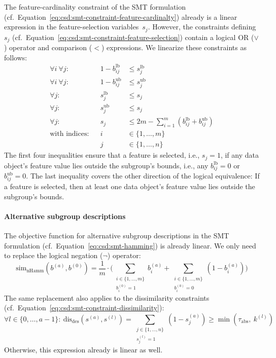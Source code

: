 The feature-cardinality constraint of the SMT formulation (cf.~Equation~\ref{eq:csd:smt-constraint-feature-cardinalty}) already is a linear expression in the feature-selection variables~$s_j$.
However, the constraints defining~$s_j$ (cf.~Equation~\ref{eq:csd:smt-constraint-feature-selection}) contain a logical OR ($\lor$) operator and comparison ($<$) expressions.
We linearize these constraints as follows:
%
\begin{equation}
	\begin{aligned}
		\forall i~\forall j: & & 1 - b^{\text{lb}}_{ij} &\leq s^{\text{lb}}_j \\
		\forall i~\forall j: & & 1 - b^{\text{ub}}_{ij} &\leq s^{\text{ub}}_j \\
		\forall j: & & s^{\text{lb}}_j &\leq s_j \\
		\forall j: & & s^{\text{ub}}_j &\leq s_j \\
		\forall j: & & s_j &\leq 2m - \sum_{i=1}^{m} \left( b^{\text{lb}}_{ij} + b^{\text{ub}}_{ij} \right) \\
		\text{with indices:} & & i &\in \{1, \dots, m\} \\
		& & j &\in \{1, \dots, n\}
	\end{aligned}
	\label{eq:csd:milp-constraint-feature-selection}
\end{equation}
%
The first four inequalities ensure that a feature is selected, i.e., $s_j = 1$, if any data object's feature value lies outside the subgroup's bounds, i.e., any $b^{\text{lb}}_{ij} = 0$ or $b^{\text{ub}}_{ij} = 0$.
The last inequality covers the other direction of the logical equivalence:
If a feature is selected, then at least one data object's feature value lies outside the subgroup's bounds.

\paragraph{Alternative subgroup descriptions}

The objective function for alternative subgroup descriptions in the SMT formulation (cf.~Equation~\ref{eq:csd:smt-hamming}) is already linear.
We only need to replace the logical negation ($\lnot$) operator:
%
\begin{equation}
	\text{sim}_{\text{nHamm}}(b^{(a)}, b^{(0)}) = \frac{1}{m} \cdot \Big( \sum\limits_{\substack{i \in \{1, \dots, m\} \\ b_i^{(0)} = 1}} b_i^{(a)} + \sum\limits_{\substack{i \in \{1, \dots, m\} \\ b_i^{(0)} = 0}} \left( 1 - b_i^{(a)} \right) \Big)
	\label{eq:csd:mip-hamming}
\end{equation}
%
The same replacement also applies to the dissimilarity constraints (cf.~Equation~\ref{eq:csd:smt-constraint-dissimilarity}):
%
\begin{equation}
	\forall l \in \{0, \dots, a-1\}:~ \text{dis}_{\text{des}}(s^{(a)}, s^{(l)}) = \sum_{\substack{j \in \{1, \dots, n\} \\ s^{(l)}_j = 1}} \left(1 - s^{(a)}_j \right) \geq \min \left( \tau_{\text{abs}},~k^{(l)} \right)
	\label{eq:csd:mip-constraint-dissimilarity}
\end{equation}
%
Otherwise, this expression already is linear as well.


